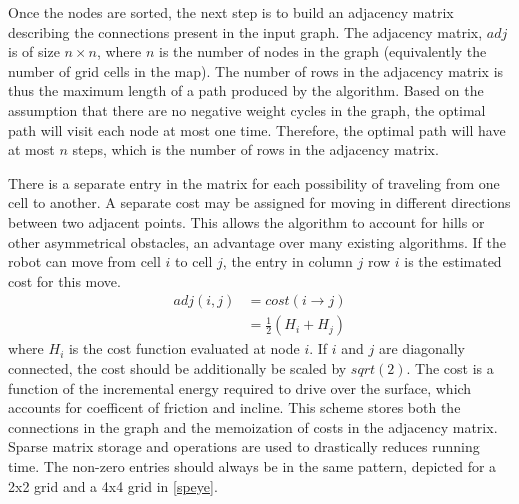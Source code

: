 \documentclass[journal]{IEEEtran}
\newcounter{row}
\newcounter{col}
\begin{document}
Once the nodes are sorted, the next step is to build an adjacency matrix describing the connections present in the input graph.
The adjacency matrix, $adj$ is of size $n \times n$, where $n$ is the number of nodes in the graph (equivalently the number of grid cells in the map). 
The number of rows in the adjacency matrix is thus the maximum length of a path produced by the algorithm.
Based on the assumption that there are no negative weight cycles in the graph, the optimal path will visit each node at most one time.
Therefore, the optimal path will have at most $n$ steps, which is the number of rows in the adjacency matrix. 

There is a separate entry in the matrix for each possibility of traveling from one cell to another.
A separate cost may be assigned for moving in different directions between  two adjacent points. 
This allows the algorithm to account for hills or other asymmetrical obstacles, an advantage over many existing algorithms.
If the robot can move from cell $i$ to cell $j$, the entry in column $j$ row $i$ is the estimated cost for this move. 
\begin{align}
adj(i,j) &= cost(i \rightarrow j) \\
		 &= \frac{1}{2}(H_i + H_j)
\end{align}
where $H_i$ is the cost function evaluated at node $i$. If $i$ and $j$ are diagonally connected, the cost should be additionally be scaled by $sqrt(2)$.
The cost is a function of the incremental energy required to drive over the surface, which accounts for coefficent of friction and incline.
This scheme stores both the connections in the graph and the memoization of costs in the adjacency matrix. 
Sparse matrix storage and operations are used to drastically reduces running time.
The non-zero entries should always be in the same pattern, depicted for a 2x2 grid and a 4x4 grid in \ref{speye}. 
\end{document}
